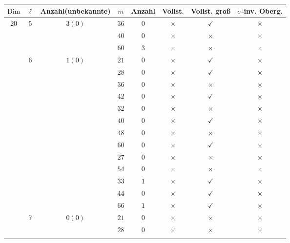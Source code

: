 \documentclass[12pt,a4paper,halfparskip,headsepline,bibtotocnumbered]{scrreprt}
\theoremstyle{nummermitklammern}
\theoremstyle{nonumberbreak}
\newcommand{\Dim}{\text{Dim}}
\begin{document}
\begin{table}[H]
	\centering
	\begin{tabular}{|c|c|c|c|c|c|c|c|}
		\hline		
		$\Dim$					&$\ell$					&{Anzahl(unbekannte)}		&$m$	&Anzahl	&Vollst.	&Vollst. groß	&$\sigma$-inv. Oberg.\\ \hline
		\multirow{26}{*}{$20$}	&\multirow{3}{*}{$5$}	&\multirow{3}{*}{$3(0)$}	&$36$	&$0$	&$\times$		&$\checkmark$	&$\times$\\ \cline{4-8}
								&						&							&$40$	&$0$	&$\times$		&$\times$		&$\times$\\ \cline{4-8}
								&						&							&$60$	&$3$	&$\times$		&$\times$		&$\times$\\ \cline{2-8}	
								&\multirow{13}{*}{$6$}	&\multirow{13}{*}{$1(0)$}	&$21$	&$0$	&$\times$		&$\checkmark$	&$\times$\\ \cline{4-8}
								&						&							&$28$	&$0$	&$\times$		&$\checkmark$	&$\times$\\ \cline{4-8}
								&						&							&$36$	&$0$	&$\times$		&$\times$		&$\times$\\ \cline{4-8}
								&						&							&$42$	&$0$	&$\times$		&$\checkmark$	&$\times$\\ \cline{4-8}
								&						&							&$32$	&$0$	&$\times$		&$\times$		&$\times$\\ \cline{4-8}
								&						&							&$40$	&$0$	&$\times$		&$\checkmark$	&$\times$\\ \cline{4-8}
								&						&							&$48$	&$0$	&$\times$		&$\times$		&$\times$\\ \cline{4-8}
								&						&							&$60$	&$0$	&$\times$		&$\checkmark$	&$\times$\\ \cline{4-8}
								&						&							&$27$	&$0$	&$\times$		&$\times$		&$\times$\\ \cline{4-8}
								&						&							&$54$	&$0$	&$\times$		&$\times$		&$\times$\\ \cline{4-8}
								&						&							&$33$	&$1$	&$\times$		&$\checkmark$	&$\times$\\ \cline{4-8}
								&						&							&$44$	&$0$	&$\times$		&$\checkmark$	&$\times$\\ \cline{4-8}
								&						&							&$66$	&$1$	&$\times$		&$\checkmark$	&$\times$\\ \cline{2-8}
								&\multirow{4}{*}{$7$}	&\multirow{4}{*}{$0(0)$}	&$21$	&$0$	&$\times$		&$\times$		&$\times$\\ \cline{4-8}
								&						&							&$28$	&$0$	&$\times$		&$\times$		&$\times$\\ \cline{4-8}

\end{tabular}
\end{table}
\end{document}
